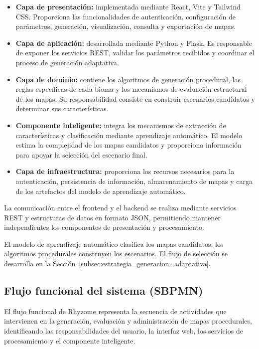 \begin{itemize}
	
	\item \textbf{Capa de presentación:}
	implementada mediante React, Vite y Tailwind CSS. Proporciona las funcionalidades de autenticación, configuración de parámetros, generación, visualización, consulta y exportación de mapas.
	
	\item \textbf{Capa de aplicación:}
	desarrollada mediante Python y Flask. Es responsable de exponer los servicios REST, validar los parámetros recibidos y coordinar el proceso de generación adaptativa.
	
	\item \textbf{Capa de dominio:}
	contiene los algoritmos de generación procedural, las reglas específicas de cada bioma y los mecanismos de evaluación estructural de los mapas. Su responsabilidad consiste en construir escenarios candidatos y determinar sus características.
	
	\item \textbf{Componente inteligente:}
	integra los mecanismos de extracción de características y clasificación mediante aprendizaje automático. El modelo estima la complejidad de los mapas candidatos y proporciona información para apoyar la selección del escenario final.
	
	\item \textbf{Capa de infraestructura:}
	proporciona los recursos necesarios para la autenticación, persistencia de información, almacenamiento de mapas y carga de los artefactos del modelo de aprendizaje automático.
	
\end{itemize}

La comunicación entre el frontend y el backend se realiza mediante servicios REST y estructuras de datos en formato JSON, permitiendo mantener independientes los componentes de presentación y procesamiento.

El modelo de aprendizaje automático clasifica los mapas candidatos; los algoritmos procedurales construyen los escenarios. El flujo de selección se desarrolla en la Sección~\ref{subsec:estrategia_generacion_adaptativa}.

\subsection{Flujo funcional del sistema (SBPMN)}
\label{subsec:flujo_funcional}

El flujo funcional de Rhyzome representa la secuencia de actividades que intervienen en la generación, evaluación y administración de mapas procedurales, identificando las responsabilidades del usuario, la interfaz web, los servicios de procesamiento y el componente inteligente.


